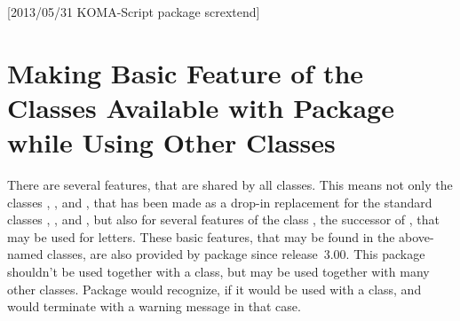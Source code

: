 %
%
%
%
%
%
%
%
% 
%
%
%
%

[2013/05/31 KOMA-Script package scrextend]


\chapter{Making Basic Feature of the \KOMAScript{} Classes Available with
  Package  while Using Other Classes}
%

There are several features, that are shared by all \KOMAScript{} classes. This
means not only the classes , , and
, that has been made as a drop-in replacement for the standard
classes , , and , but also for
several features of the \KOMAScript{} class , the successor of
, that may be used for letters. These basic features, that may
be found in the above-named classes, are also provided by package
 since \KOMAScript{} release~3.00. This package shouldn't
be used together with a \KOMAScript{} class, but may be used together with
many other classes. Package  would recognize, if it would
be used with a \KOMAScript{} class, and would terminate with a warning message
in that case.


